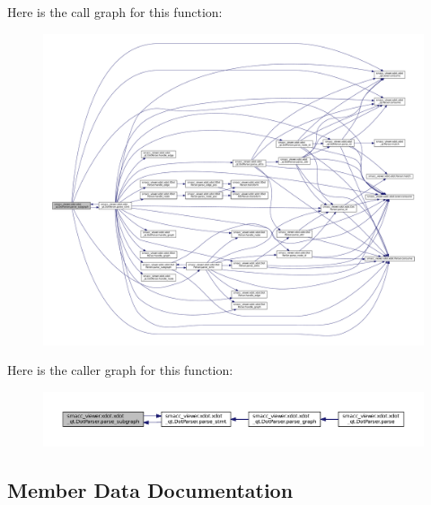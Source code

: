 Here is the call graph for this function\+:
\nopagebreak
\begin{figure}[H]
\begin{center}
\leavevmode
\includegraphics[width=350pt]{classsmacc__viewer_1_1xdot_1_1xdot__qt_1_1DotParser_ac71e76d074947d5d4929bdc699df9614_cgraph}
\end{center}
\end{figure}




Here is the caller graph for this function\+:
\nopagebreak
\begin{figure}[H]
\begin{center}
\leavevmode
\includegraphics[width=350pt]{classsmacc__viewer_1_1xdot_1_1xdot__qt_1_1DotParser_ac71e76d074947d5d4929bdc699df9614_icgraph}
\end{center}
\end{figure}




\subsection{Member Data Documentation}
